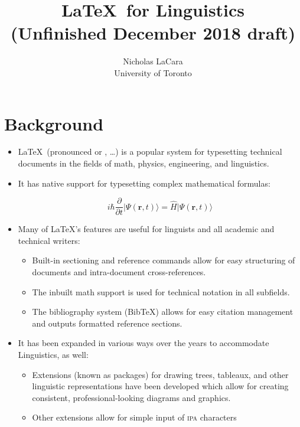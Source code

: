 \documentclass[11pt, letterpaper]{article}
\title{\LaTeX\ for Linguistics \\ (Unfinished December 2018 draft)}
\author{Nicholas LaCara \\ University of Toronto}
\date{}
\begin{document}
  
  \maketitle
  
  \tableofcontents
  
  \newpage
  
  \section{Background}
  
    \begin{itemize}
      \item \LaTeX\ (pronounced \textipa{["lA.tEx]} or \textipa{["lA.tEk]}, \ldots) is a popular system for typesetting technical documents in the fields of math, physics, engineering, and linguistics.
      
      \item It has native support for typesetting complex mathematical formulas:
      
	$$ i \hbar \frac{\partial}{\partial t}\vert\Psi(\mathbf{r},t)\rangle = \hat H\vert\Psi(\mathbf{r},t)\rangle $$
	
	\item Many of \LaTeX's features are useful for linguists and all academic and technical writers:
	
	  \begin{itemize}	    
	    \item Built-in sectioning and reference commands allow for easy structuring of documents and intra-document cross-references.
	    
	    \item The inbuilt math support is used for technical notation in all subfields.

	    \item The bibliography system (Bib\TeX) allows for easy citation management and outputs formatted reference sections.	    

	  \end{itemize}

      
      \item It has been expanded in various ways over the years to accommodate Linguistics, as well:
      
	  \begin{itemize}
	    
	    \item Extensions (known as packages) for drawing trees, tableaux, and other linguistic representations have been developed which allow for creating consistent, professional-looking diagrams and graphics.
	    
	    \item Other extensions allow for simple input of \textsc{ipa} characters
	  \end{itemize}
      
    \end{itemize}
    
\end{document}
